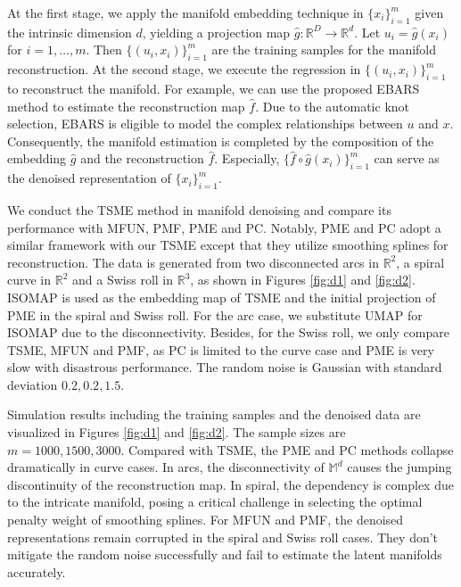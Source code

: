 At the first stage, we apply the manifold embedding technique in $\{x_i\}_{i=1}^m$ given the intrinsic dimension $d$, yielding a projection map $\hat{g}:\mathbb{R}^D\rightarrow \mathbb{R}^d$. Let $u_i=\hat{g}(x_i)$ for $i=1,\ldots,m$. Then $\{(u_i,x_i)\}_{i=1}^m$ are the training samples for the manifold reconstruction. At the second stage, we execute the regression in $\{(u_i,x_i)\}_{i=1}^m$ to reconstruct the manifold. For example, we can use the proposed EBARS method to estimate the reconstruction map $\hat{f}$. Due to the automatic knot selection, EBARS is eligible to model the complex relationships between $u$ and $x$. Consequently, the manifold estimation is completed by the composition of the embedding $\hat{g}$ and the reconstruction $\hat{f}$. Especially, $\{\hat{f}\circ \hat{g}(x_i)\}_{i=1}^m$ can serve as the denoised representation of $\{x_i\}_{i=1}^m$. %

We conduct the TSME method in manifold denoising and compare its performance with MFUN, PMF, PME and PC. Notably, PME and PC adopt a similar framework with our TSME except that they utilize smoothing splines for reconstruction. The data is generated from two disconnected arcs in $\mathbb{R}^2$, a spiral curve in $\mathbb{R}^2$ and a Swiss roll in $\mathbb{R}^3$, as shown in Figures \ref{fig:d1} and \ref{fig:d2}.%
ISOMAP is used as the embedding map of TSME and the initial projection of PME in the spiral and  Swiss roll. For the arc case, we substitute UMAP for ISOMAP due to the disconnectivity. Besides, for the Swiss roll, we only compare TSME, MFUN and PMF, as PC is limited to the curve case and PME is very slow with disastrous performance. The random noise is Gaussian with standard deviation $0.2,0.2,1.5$.

Simulation results including the training samples and the denoised data are visualized in Figures \ref{fig:d1} and \ref{fig:d2}. The sample sizes are $m=1000,1500,3000$. Compared with TSME, the PME and PC methods collapse dramatically in curve cases. In arcs, the disconnectivity of $\mathbb{M}^d$ causes the jumping discontinuity of the reconstruction map. %
In spiral, the dependency is complex due to the intricate manifold, posing a critical challenge in selecting the optimal penalty weight of smoothing splines. %
For MFUN and PMF, the denoised representations remain corrupted in the spiral and Swiss roll cases. They don't mitigate the random noise successfully and fail to estimate the latent manifolds accurately.

